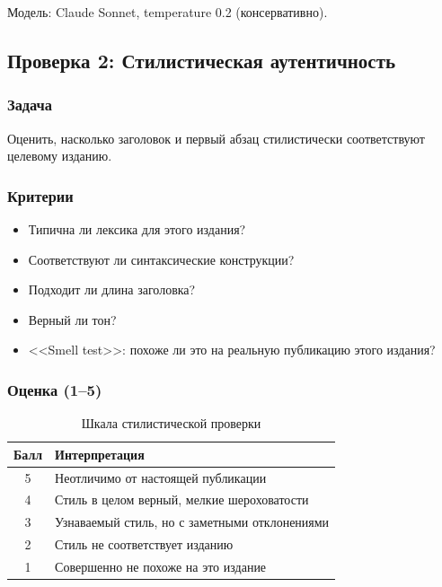 Модель: Claude Sonnet, temperature 0.2 (консервативно).

\subsection{Проверка 2: Стилистическая аутентичность}

\subsubsection{Задача}

Оценить, насколько заголовок и первый абзац стилистически соответствуют целевому изданию.

\subsubsection{Критерии}

\begin{itemize}
  \item Типична ли лексика для этого издания?
  \item Соответствуют ли синтаксические конструкции?
  \item Подходит ли длина заголовка?
  \item Верный ли тон?
  \item <<Smell test>>: похоже ли это на реальную публикацию этого издания?
\end{itemize}

\subsubsection{Оценка (1--5)}

\begin{table}[h]
  \centering
  \caption{Шкала стилистической проверки}
  \label{tab:style-score}
  \begin{tabular}{|c|l|}
    \hline
    \textbf{Балл} & \textbf{Интерпретация} \\
    \hline
    5 & Неотличимо от настоящей публикации \\
    \hline
    4 & Стиль в целом верный, мелкие шероховатости \\
    \hline
    3 & Узнаваемый стиль, но с заметными отклонениями \\
    \hline
    2 & Стиль не соответствует изданию \\
    \hline
    1 & Совершенно не похоже на это издание \\
    \hline
  \end{tabular}
\end{table}

